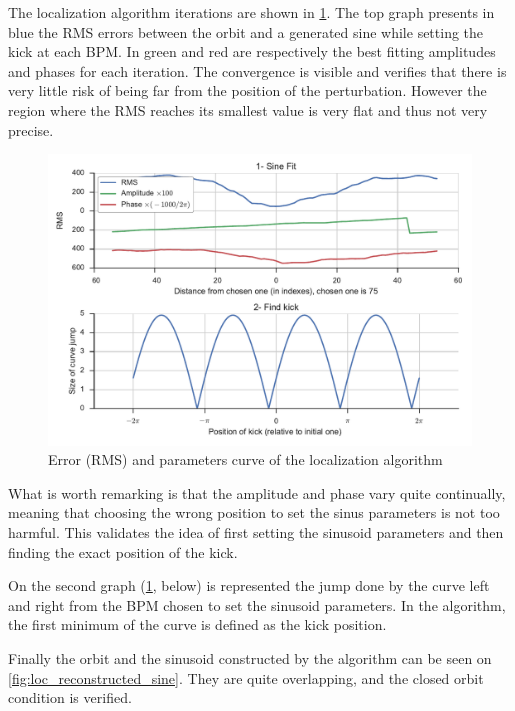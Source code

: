The localization algorithm iterations are shown in \cref{fig:loc_errorplots}. The top graph presents in blue the RMS errors between the orbit and a generated sine while setting the kick at each BPM. In green and red are respectively the best fitting amplitudes and phases for each iteration. The convergence is visible and verifies that there is very little risk of being far from the position of the perturbation. However the region where the RMS reaches its smallest value is very flat and thus not very precise.

\begin{figure}
    \centering
    \includegraphics[width=\linewidth]{img/loc_errorplots}
    \caption{\label{fig:loc_errorplots} Error (RMS) and parameters curve of the localization algorithm}
\end{figure}

What is worth remarking is that the amplitude and phase vary quite continually, meaning that choosing the wrong position to set the sinus parameters is not too harmful. This validates the idea of first setting the sinusoid parameters and then finding the exact position of the kick.

On the second graph (\cref{fig:loc_errorplots}, below) is represented the jump done by the curve left and right from the BPM chosen to set the sinusoid parameters. In the algorithm, the first minimum of the curve is defined as the kick position.

Finally the orbit and the sinusoid constructed by the algorithm can be seen on \cref{fig:loc_reconstructed_sine}. They are quite overlapping, and the closed orbit condition is verified.

